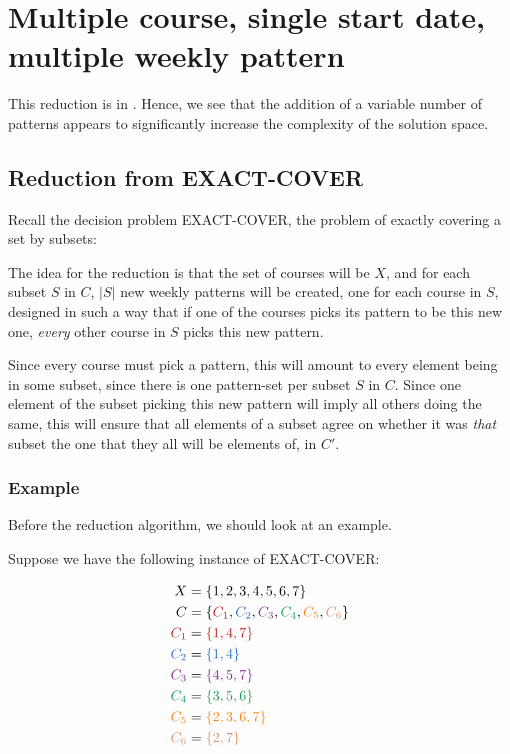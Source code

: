 \section{Multiple course, single start date, multiple weekly pattern}

This reduction is in \nph. Hence, we see that the addition of a variable number of patterns appears to significantly increase the complexity of the solution space.

\subsection{Reduction from EXACT-COVER}
Recall the decision problem EXACT-COVER, the problem of exactly covering a set by subsets:


The idea for the reduction is that the set of courses will be $X$, and for each subset $S$ in $C$, $|S|$ new weekly patterns will be created, one for each course in $S$, designed in such a way that if one of the courses picks its pattern to be this new one, \emph{every} other course in $S$ picks this new pattern.

Since every course must pick a pattern, this will amount to every element being in some subset, since there is one pattern-set per subset $S$ in $C$. Since one element of the subset picking this new pattern will imply all others doing the same, this will ensure that all elements of a subset agree on whether it was \emph{that} subset the one that they all will be elements of, in $C'$.

\subsubsection{Example}
Before the reduction algorithm, we should look at an example.

Suppose we have the following instance of EXACT-COVER:

\begin{align*}
X &= \{1, 2, 3, 4, 5, 6, 7\}\\
C &= \{{\color{BrickRed}C_1}, {\color{NavyBlue}C_2}, {\color{Fuchsia}C_3}, {\color{ForestGreen}C_4}, {\color{BurntOrange}C_5}, {\color{Tan}C_6}\}\\
{\color{BrickRed} C_1} &= {\color{BrickRed} \{1, 4, 7\}}\\
{\color{NavyBlue} C_2} &= {\color{NavyBlue}\{ 1, 4 \} }\\
{\color{Fuchsia} C_3} &= {\color{Fuchsia} \{ 4, 5, 7\} }\\
{\color{ForestGreen} C_4} &= {\color{ForestGreen} \{ 3, 5, 6\} }\\
{\color{BurntOrange} C_5} &= {\color{BurntOrange} \{ 2, 3, 6, 7 \}}\\
{\color{Tan} C_6} &= {\color{Tan} \{2, 7\}}
\end{align*}


